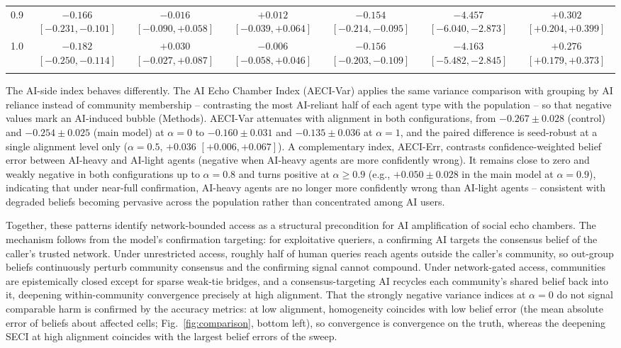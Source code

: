 \documentclass[sn-apacite]{sn-jnl}
\begin{document}
\begin{table}[h]
{\begin{tabular}{@{}lcccccc@{}}
0.9 & $\mathbf{-0.166}$ $[-0.231, -0.101]$ & $-0.016$ $[-0.090, +0.058]$ & $+0.012$ $[-0.039, +0.064]$ & $\mathbf{-0.154}$ $[-0.214, -0.095]$ & $\mathbf{-4.457}$ $[-6.040, -2.873]$ & $\mathbf{+0.302}$ $[+0.204, +0.399]$ \\
1.0 & $\mathbf{-0.182}$ $[-0.250, -0.114]$ & $+0.030$ $[-0.027, +0.087]$ & $-0.006$ $[-0.058, +0.046]$ & $\mathbf{-0.156}$ $[-0.203, -0.109]$ & $\mathbf{-4.163}$ $[-5.482, -2.845]$ & $\mathbf{+0.276}$ $[+0.179, +0.373]$ \\
\botrule
\end{tabular}}
\end{table}

The AI-side index behaves differently. The AI Echo Chamber Index (AECI-Var) applies the same variance comparison with grouping by AI reliance instead of community membership -- contrasting the most AI-reliant half of each agent type with the population -- so that negative values mark an AI-induced bubble (Methods). AECI-Var attenuates with alignment in both configurations, from $-0.267 \pm 0.028$ (control) and $-0.254 \pm 0.025$ (main model) at $\alpha = 0$ to $-0.160 \pm 0.031$ and $-0.135 \pm 0.036$ at $\alpha = 1$, and the paired difference is seed-robust at a single alignment level only ($\alpha = 0.5$, $+0.036$ $[+0.006, +0.067]$). A complementary index, AECI-Err, contrasts confidence-weighted belief error between AI-heavy and AI-light agents (negative when AI-heavy agents are more confidently wrong). It remains close to zero and weakly negative in both configurations up to $\alpha = 0.8$ and turns positive at $\alpha \geq 0.9$ (e.g., $+0.050 \pm 0.028$ in the main model at $\alpha = 0.9$), indicating that under near-full confirmation, AI-heavy agents are no longer more confidently wrong than AI-light agents -- consistent with degraded beliefs becoming pervasive across the population rather than concentrated among AI users.

Together, these patterns identify network-bounded access as a structural precondition for AI amplification of social echo chambers. The mechanism follows from the model's confirmation targeting: for exploitative queriers, a confirming AI targets the consensus belief of the caller's trusted network. Under unrestricted access, roughly half of human queries reach agents outside the caller's community, so out-group beliefs continuously perturb community consensus and the confirming signal cannot compound. Under network-gated access, communities are epistemically closed except for sparse weak-tie bridges, and a consensus-targeting AI recycles each community's shared belief back into it, deepening within-community convergence precisely at high alignment. That the strongly negative variance indices at $\alpha = 0$ do not signal comparable harm is confirmed by the accuracy metrics: at low alignment, homogeneity coincides with low belief error (the mean absolute error of beliefs about affected cells; Fig.~\ref{fig:comparison}, bottom left), so convergence is convergence on the truth, whereas the deepening SECI at high alignment coincides with the largest belief errors of the sweep.
\end{document}
